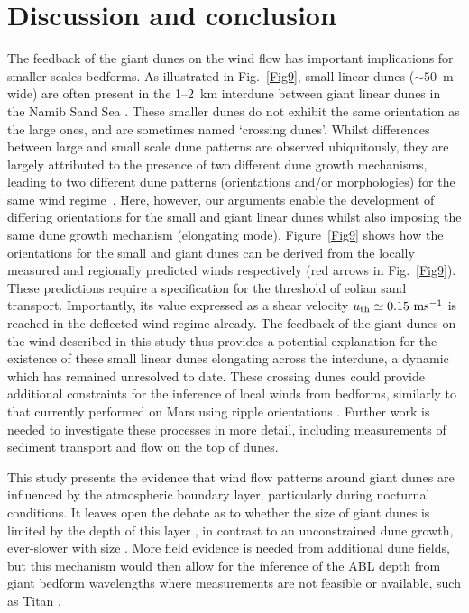 \section{Discussion and conclusion}
The feedback of the giant dunes on the wind flow has important implications for smaller scales bedforms. As illustrated in Fig.~\ref{Fig9}, small linear dunes ($\sim50$~m wide) are often present in the 1--2~km interdune between giant linear dunes in the Namib Sand Sea \citep{Livingstone2010}. These smaller dunes do not exhibit the same orientation as the large ones, and are sometimes named `crossing dunes'. Whilst differences between large and small scale dune patterns are observed ubiquitously, they are largely attributed to the presence of two different dune growth mechanisms, leading to two different dune patterns (orientations and/or morphologies) for the same wind regime~\citep{Courrech2014, Runyon2017, lu2017, Song2019, Gadal2020, Hu2021}. Here, however, our arguments enable the development of differing orientations for the small and giant linear dunes whilst also imposing the same dune growth mechanism (elongating mode). Figure~\ref{Fig9} shows how the orientations for the small and giant dunes can be derived from the locally measured and regionally predicted winds respectively (red arrows in Fig.~\ref{Fig9}). These predictions require a specification for the threshold of eolian sand transport. Importantly, its value expressed as a shear velocity $u_{\textup{th}} \simeq 0.15~\textup{m}\textup{s}^{-1}$ is reached in the deflected wind regime already. The feedback of the giant dunes on the wind described in this study thus provides a potential explanation for the existence of these small linear dunes elongating across the interdune, a dynamic which has remained unresolved to date. These crossing dunes could provide additional constraints for the inference of local winds from bedforms, similarly to that currently performed on Mars using ripple orientations \citep{Liu2015, Hood2021}. Further work is needed to investigate these processes in more detail, including measurements of sediment transport and flow on the top of dunes.

This study presents the evidence that wind flow patterns around giant dunes are influenced by the atmospheric boundary layer, particularly during nocturnal conditions. It leaves open the debate as to whether the size of giant dunes is limited by the depth of this layer \citep{Andreotti2009}, in contrast to an unconstrained dune growth, ever-slower with size \citep{Gunn2021b}. More field evidence is needed from additional dune fields, but this mechanism would then allow for the inference of the ABL depth from giant bedform wavelengths where measurements are not feasible or available, such as Titan \citep{Lorenz2010}.


